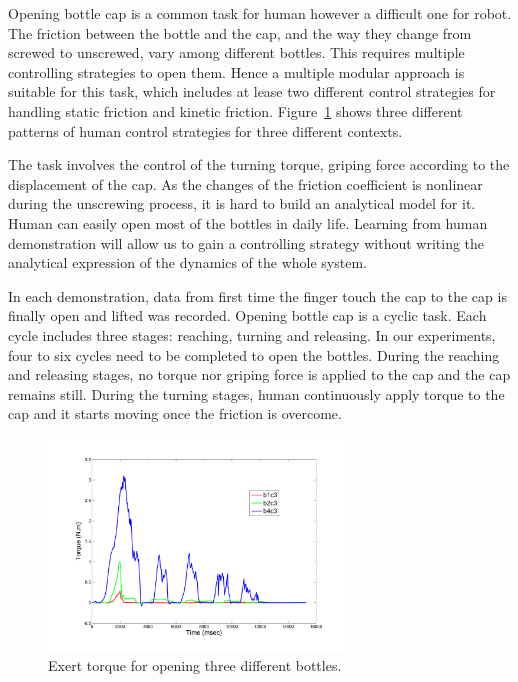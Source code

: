 Opening bottle cap is a common task for human however a difficult one for robot. The friction between the bottle and the cap, and the way they change from screwed to unscrewed, vary among different bottles. This requires multiple controlling strategies to open them. Hence a multiple modular approach is suitable for this task, which includes at lease two different control strategies for handling static friction and kinetic friction. Figure~\ref{fig:bottlepatterns} shows three different patterns of human control strategies for three different contexts.

The task involves the control of the turning torque, griping force according to the displacement of the cap. As the changes of the friction coefficient is nonlinear during the unscrewing process, it is hard to build an analytical model for it. Human can easily open most of the bottles in daily life. Learning from human demonstration will allow us to gain a controlling strategy without writing the analytical expression of the dynamics of the whole system.

In each demonstration, data from first time the finger touch the cap to the cap is finally open and lifted was recorded. Opening bottle cap is a cyclic task. Each cycle includes three stages: reaching, turning and releasing. In our experiments, four to six cycles need to be completed to open the bottles. During the reaching and releasing stages, no torque nor griping force is applied to the cap and the cap remains still. During the turning stages, human continuously apply torque to the cap and it starts moving once the friction is overcome.

\begin{figure}
  \centering
  \includegraphics[width=8cm]{./fig/b1b3b4_time_T_2.pdf}
  \caption{ \scriptsize{Exert torque for opening three different bottles.}
}
\label{fig:bottlepatterns}
\end{figure}


